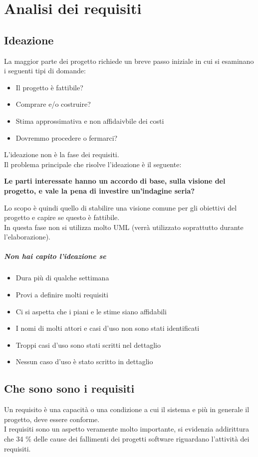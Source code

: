 \chapter{Analisi dei requisiti}
\section{Ideazione}
La maggior parte dei progetto richiede un breve passo iniziale in cui
si esaminano i seguenti tipi di domande:
\begin{itemize}
    \item Il progetto è fattibile?
    \item Comprare e/o costruire?
    \item Stima approssimativa e non affidaivbile dei costi
    \item Dovremmo procedere o fermarci?
\end{itemize}
L'ideazione non è la fase dei requisiti.
\\ Il problema principale che risolve l'ideazione è il seguente:
\begin{center}
    \textbf{Le parti interessate hanno un accordo di base, sulla visione
    del progetto, e vale la pena di investire un'indagine seria?}
\end{center}
Lo scopo è quindi quello di stabilire una visione comune per gli obiettivi del progetto
e capire se questo è fattibile.
\\ In questa fase non si utilizza molto UML (verrà utilizzato soprattutto durante
 l'elaborazione).
\paragraph*{Non hai capito l'ideazione se}
\begin{itemize}
    \item Dura più di qualche settimana
    \item Provi a definire molti requisiti
    \item Ci si aspetta che i piani e le stime siano affidabili
    \item I nomi di molti attori e casi d'uso non sono stati identificati
    \item Troppi casi d'uso sono stati scritti nel dettaglio
    \item Nessun caso d'uso è stato scritto in dettaglio
\end{itemize}
\section{Che sono sono i requisiti}
Un requisito è una capacità o una condizione a cui il sistema e più in generale il
progetto, deve essere conforme.
\\ I requisiti sono un aspetto veramente molto importante, si evidenzia
addirittura che 34 \% delle cause dei fallimenti dei progetti software
riguardano l'attività dei requisiti.
